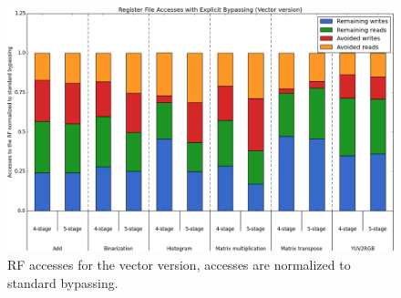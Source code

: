 \begin{figure}[H]
\centering
\hspace*{-.12in}
\includegraphics[width=.875\textwidth]{figures/stats/vec_accesses}
\caption{RF accesses for the vector version, accesses are normalized to standard bypassing.}
\label{fig:vec_accesses}
\end{figure}










